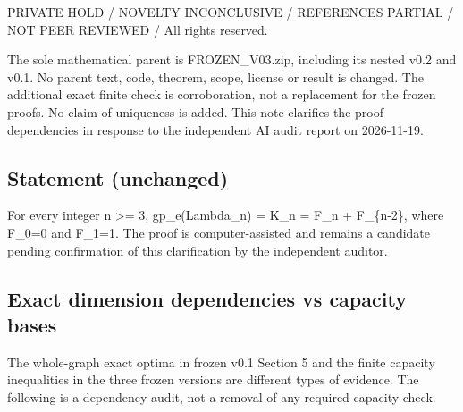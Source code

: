 \documentclass[
  10pt,
]{article}
\begin{document}
PRIVATE HOLD / NOVELTY INCONCLUSIVE / REFERENCES PARTIAL / NOT PEER
REVIEWED / All rights reserved.

The sole mathematical parent is FROZEN\_V03.zip, including its nested
v0.2 and v0.1. No parent text, code, theorem, scope, license or result
is changed. The additional exact finite check is corroboration, not a
replacement for the frozen proofs. No claim of uniqueness is added. This
note clarifies the proof dependencies in response to the independent AI
audit report on 2026-11-19.

\subsection{Statement (unchanged)}\label{statement-unchanged}

For every integer n \textgreater= 3, gp\_e(Lambda\_n) = K\_n = F\_n +
F\_\{n-2\}, where F\_0=0 and F\_1=1. The proof is computer-assisted and
remains a candidate pending confirmation of this clarification by the
independent auditor.

\subsection{Exact dimension dependencies vs capacity
bases}\label{exact-dimension-dependencies-vs-capacity-bases}

The whole-graph exact optima in frozen v0.1 Section 5 and the finite
capacity inequalities in the three frozen versions are different types
of evidence. The following is a dependency audit, not a removal of any
required capacity check.
\end{document}
